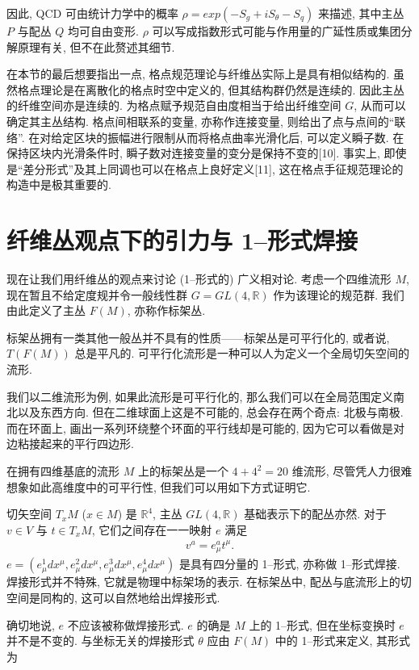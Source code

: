 \documentclass{article}
\begin{document}
\par 因此, QCD 可由统计力学中的概率 $\rho= exp(-S_g +iS_\theta-S_q)$ 来描述, 其中主丛 $P$ 与配丛 $Q$ 均可自由变形. $\rho$ 可以写成指数形式可能与作用量的广延性质或集团分解原理有关, 但不在此赘述其细节.

\par 在本节的最后想要指出一点, 格点规范理论与纤维丛实际上是具有相似结构的. 虽然格点理论是在离散化的格点时空中定义的, 但其结构群仍然是连续的. 因此主丛的纤维空间亦是连续的. 为格点赋予规范自由度相当于给出纤维空间 $G$, 从而可以确定其主丛结构. 格点间相联系的变量, 亦称作连接变量, 则给出了点与点间的``联络''. 在对给定区块的振幅进行限制从而将格点曲率光滑化后, 可以定义瞬子数. 在保持区块内光滑条件时, 瞬子数对连接变量的变分是保持不变的[10]. 事实上, 即使是``差分形式''及其上同调也可以在格点上良好定义[11], 这在格点手征规范理论的构造中是极其重要的.
\section{纤维丛观点下的引力与 1--形式焊接}
现在让我们用纤维丛的观点来讨论 (1--形式的) 广义相对论. 考虑一个四维流形 $M$, 现在暂且不给定度规并令一般线性群 $G=GL(4,\mathbb{R})$ 作为该理论的规范群. 我们由此定义了主丛 $F(M)$, 亦称作标架丛.
\par
标架丛拥有一类其他一般丛并不具有的性质——标架丛是可平行化的, 或者说, $T(F(M))$ 总是平凡的. 可平行化流形是一种可以人为定义一个全局切矢空间的流形.
\par
我们以二维流形为例, 如果此流形是可平行化的, 那么我们可以在全局范围定义南北以及东西方向. 但在二维球面上这是不可能的, 总会存在两个奇点: 北极与南极. 而在环面上, 画出一系列环绕整个环面的平行线却是可能的, 因为它可以看做是对边粘接起来的平行四边形.
\par
在拥有四维基底的流形 $M$ 上的标架丛是一个 $4+4^{2}=20$ 维流形, 尽管凭人力很难想象如此高维度中的可平行性, 但我们可以用如下方式证明它.
\par
切矢空间 $T_{x}M$ ($x\in M$) 是 $\mathbb{R}^{4}$, 主丛 $GL(4,\mathbb{R})$ 基础表示下的配丛亦然. 对于 $v\in V$ 与 $t\in T_{x}M$, 它们之间存在一一映射 $e$ 满足
\begin{align}
v^{a}=e^{a}_{\mu}t^{\mu}.
\end{align}
$e=(e_{\mu}^{1}dx^{\mu},e_{\mu}^{2}dx^{\mu},e_{\mu}^{3}dx^{\mu},e_{\mu}^{4}dx^{\mu})$ 是具有四分量的 1--形式, 亦称做 1--形式焊接. 焊接形式并不特殊, 它就是物理中标架场的表示. 在标架丛中, 配丛与底流形上的切空间是同构的, 这可以自然地给出焊接形式.
\par
确切地说, $e$ 不应该被称做焊接形式. $e$ 的确是 $M$ 上的 1--形式, 但在坐标变换时 $e$ 并不是不变的. 与坐标无关的焊接形式 $\theta$ 应由 $F(M)$ 中的 1--形式来定义, 其形式为
\end{document}
